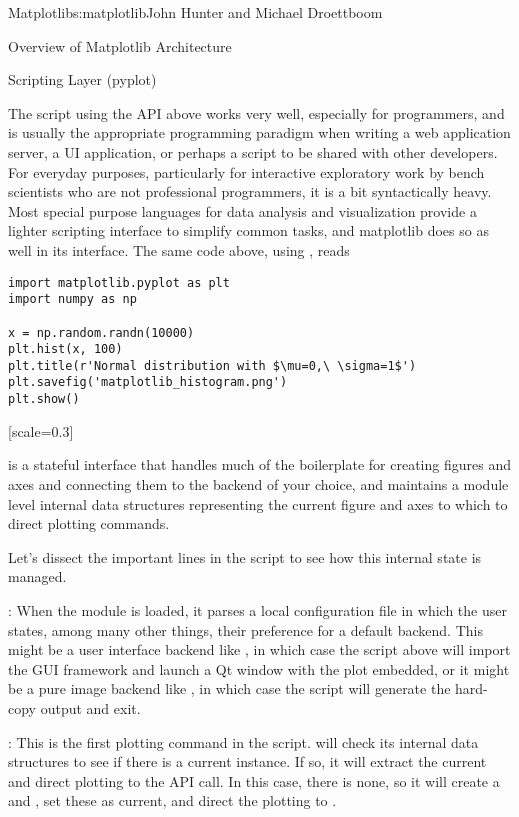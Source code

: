 \begin{aosachapter}{Matplotlib}{s:matplotlib}{John Hunter and Michael Droettboom}
\begin{aosasect1}{Overview of Matplotlib Architecture}
\begin{aosasect2}{Scripting Layer (pyplot)}

The script using the API above works very well, especially for programmers,
and is usually the appropriate programming paradigm when writing a
web application server, a UI application, or perhaps a script to be
shared with other developers.  For everyday purposes, particularly
for interactive exploratory work by bench scientists who are not
professional programmers, it is a bit syntactically heavy.  Most
special purpose languages for data analysis and visualization
provide a lighter scripting interface to simplify common tasks, and
matplotlib does so as well in its 
interface.  The same code above, using , reads

\begin{verbatim}
import matplotlib.pyplot as plt
import numpy as np

x = np.random.randn(10000)
plt.hist(x, 100)
plt.title(r'Normal distribution with $\mu=0,\ \sigma=1$')
plt.savefig('matplotlib_histogram.png')
plt.show()
\end{verbatim}

[scale=0.3]

 is a stateful interface that handles much of the boilerplate
for creating figures and axes and connecting them to the backend of
your choice, and maintains a module level internal data structures
representing the current figure and axes to which to direct plotting
commands.

Let's dissect the important lines in the script to see how this
internal state is managed.

\begin{aosaitemize}

\item {}: When the  module
  is loaded, it parses a local configuration file in which the user
  states, among many other things, their preference for a default
  backend.  This might be a user interface backend like ,
  in which case the script above will import the GUI framework and
  launch a Qt window with the plot embedded, or it might be a pure
  image backend like , in which case the script will
  generate the hard-copy output and exit.

\item {}: This is the first plotting command in
  the script.   will check its internal data structures to see
  if there is a current  instance.  If so, it will
  extract the current  and direct plotting to the
   API call.  In this case, there is none, so it will
  create a  and , set these as current, and
  direct the plotting to .


\end{aosaitemize}
\end{aosasect2}
\end{aosasect1}
\end{aosachapter}
